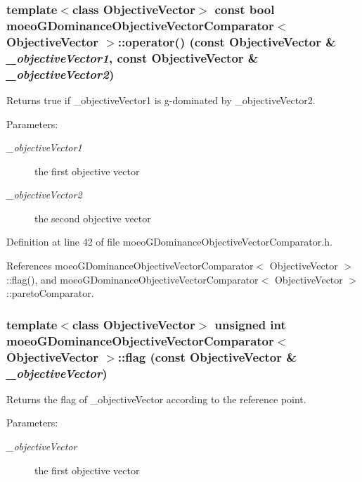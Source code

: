 \subsubsection{\setlength{\rightskip}{0pt plus 5cm}template$<$class Objective\-Vector$>$ const bool \bf{moeo\-GDominance\-Objective\-Vector\-Comparator}$<$ Objective\-Vector $>$::operator() (const Objective\-Vector \& {\em \_\-objective\-Vector1}, const Objective\-Vector \& {\em \_\-objective\-Vector2})\hspace{0.3cm}{\tt  [inline]}}\label{classmoeoGDominanceObjectiveVectorComparator_4b8c3496d77abf6e774333f3296e6d79}


Returns true if \_\-objective\-Vector1 is g-dominated by \_\-objective\-Vector2. 

\begin{Desc}
\item[Parameters:]
\begin{description}
\item[{\em \_\-objective\-Vector1}]the first objective vector \item[{\em \_\-objective\-Vector2}]the second objective vector \end{description}
\end{Desc}


Definition at line 42 of file moeo\-GDominance\-Objective\-Vector\-Comparator.h.

References moeo\-GDominance\-Objective\-Vector\-Comparator$<$ Objective\-Vector $>$::flag(), and moeo\-GDominance\-Objective\-Vector\-Comparator$<$ Objective\-Vector $>$::pareto\-Comparator.
\subsubsection{\setlength{\rightskip}{0pt plus 5cm}template$<$class Objective\-Vector$>$ unsigned int \bf{moeo\-GDominance\-Objective\-Vector\-Comparator}$<$ Objective\-Vector $>$::flag (const Objective\-Vector \& {\em \_\-objective\-Vector})\hspace{0.3cm}{\tt  [inline, private]}}\label{classmoeoGDominanceObjectiveVectorComparator_75bf5141369522563e60d4e3ac2ec9cb}


Returns the flag of \_\-objective\-Vector according to the reference point. 

\begin{Desc}
\item[Parameters:]
\begin{description}
\item[{\em \_\-objective\-Vector}]the first objective vector \end{description}
\end{Desc}


